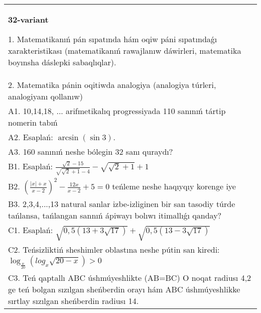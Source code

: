 \documentclass{article}
\begin{document}
\begin{tabular}{m{17cm}}
\textbf{32-variant}

1. Matematikanıń pán sıpatında hám oqiw páni sıpatındaǵı xarakteristikası (matematikanıń rawajlanıw dáwirleri, matematika boyınsha dáslepki sabaqlıqlar). \\
2. Matematika pánin oqitiwda analogiya (analogiya túrleri, analogiyanı qollanıw) \\
A1. 10,14,18, ... arifmetikalıq progressiyada 110 sanınıń tártip nomerin tabıń \\
A2. Esaplań: \(\arcsin (\sin3 ) \). \\
A3. 160 sanınıń neshe bólegin 32 sanı quraydı? \\
B1. Esaplań: \(\frac{\sqrt{2} - 15}{\sqrt{\sqrt{2} + 1} - 4} - \sqrt{\sqrt{2} + 1} + 1\) \\
B2. $(\frac{|x| + x}{x-2})^{2} - \frac{12x}{x-2} + 5 = 0$ teńleme neshe haqıyqıy korenge iye \\
B3. 2,3,4,...,13 natural sanlar izbe-izliginen bir san tasodiy túrde tańlansa, tańlangan sannıń ápiwayı bolıwı itimallıǵı qanday? \\
C1. Esaplań: \(\sqrt{0,5 (13 + 3\sqrt{17}) } + \sqrt{0,5 (13 - 3\sqrt{17}) }\) \\
C2. Teńsizliktiń sheshimler oblastına neshe pútin san kiredi:\(\log_{\frac{x}{20}} (log_{x}\sqrt{20 - x}) > 0\) \\
C3. Teń qaptallı ABC úshmúyeshlikte (AB=BC) O noqat radiusı 4,2 ge teń bolgan sızılgan sheńberdin orayı hám ABC úshmúyeshlikke sırtlay sızılgan sheńberdin radiusı 14. \\

\end{tabular}
\vspace{1cm}
\end{document}
